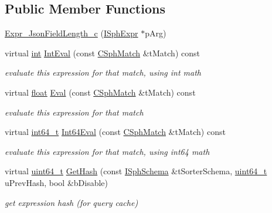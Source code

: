 \subsection*{Public Member Functions}
\begin{DoxyCompactItemize}
\item 
\hyperlink{structExpr__JsonFieldLength__c_aa4f46bba86441bfa2bba1f69a60e8dbb}{Expr\-\_\-\-Json\-Field\-Length\-\_\-c} (\hyperlink{structISphExpr}{I\-Sph\-Expr} $\ast$p\-Arg)
\item 
virtual \hyperlink{sphinxexpr_8cpp_a4a26e8f9cb8b736e0c4cbf4d16de985e}{int} \hyperlink{structExpr__JsonFieldLength__c_a093ea2dd32f53b54dc650c7bc95a1df3}{Int\-Eval} (const \hyperlink{classCSphMatch}{C\-Sph\-Match} \&t\-Match) const 
\begin{DoxyCompactList}\small\item\em evaluate this expression for that match, using int math \end{DoxyCompactList}\item 
virtual \hyperlink{sphinxexpr_8cpp_a0e0d0739f7035f18f949c2db2c6759ec}{float} \hyperlink{structExpr__JsonFieldLength__c_aafb6c2f113842a0abfac7a16169bb55b}{Eval} (const \hyperlink{classCSphMatch}{C\-Sph\-Match} \&t\-Match) const 
\begin{DoxyCompactList}\small\item\em evaluate this expression for that match \end{DoxyCompactList}\item 
virtual \hyperlink{sphinxstd_8h_a996e72f71b11a5bb8b3b7b6936b1516d}{int64\-\_\-t} \hyperlink{structExpr__JsonFieldLength__c_a97d75ca464c15a5241f6d242488f7d48}{Int64\-Eval} (const \hyperlink{classCSphMatch}{C\-Sph\-Match} \&t\-Match) const 
\begin{DoxyCompactList}\small\item\em evaluate this expression for that match, using int64 math \end{DoxyCompactList}\item 
virtual \hyperlink{sphinxstd_8h_aaa5d1cd013383c889537491c3cfd9aad}{uint64\-\_\-t} \hyperlink{structExpr__JsonFieldLength__c_a941ec42f41ba20f6c5db081e2d41e73f}{Get\-Hash} (const \hyperlink{classISphSchema}{I\-Sph\-Schema} \&t\-Sorter\-Schema, \hyperlink{sphinxstd_8h_aaa5d1cd013383c889537491c3cfd9aad}{uint64\-\_\-t} u\-Prev\-Hash, bool \&b\-Disable)
\begin{DoxyCompactList}\small\item\em get expression hash (for query cache) \end{DoxyCompactList}\end{DoxyCompactItemize}
